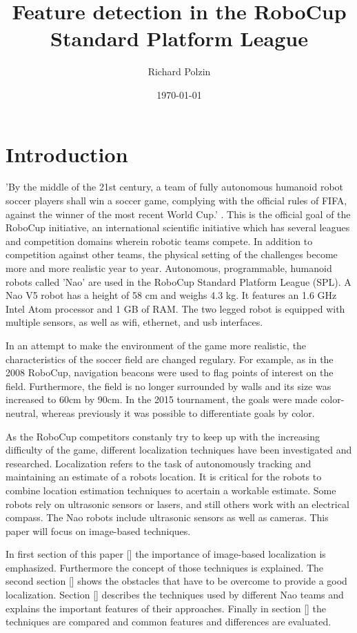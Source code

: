 \documentclass[12pt, a4paper, doc]{apa6}
\author{Richard Polzin}
\affiliation{PUT TUTOR NAME HERE}
\title{Feature detection in the RoboCup Standard Platform League}
\date{\today}
\begin{document}
  \maketitle

  \section{Introduction}
  'By the middle of the 21st century, a team of fully autonomous humanoid robot soccer players shall win a soccer game, complying with the official rules of FIFA, against the winner of the most recent World Cup.' \cite{Kitano95robocup:the}. This is the official goal of the RoboCup initiative, an international scientific initiative which has several leagues and competition domains wherein robotic teams compete. In addition to competition against other teams, the physical setting of the challenges become more and more realistic year to year. Autonomous, programmable, humanoid robots called 'Nao' are used in the RoboCup Standard Platform League (SPL). A Nao V5 robot has a height of 58 cm and weighs 4.3 kg. It features an 1.6 GHz Intel Atom processor and 1 GB of RAM. The two legged robot is equipped with multiple sensors, as well as wifi, ethernet, and usb interfaces.

  In an attempt to make the environment of the game more realistic, the characteristics of the soccer field are changed regulary. For example, as in the 2008 RoboCup, navigation beacons were used to flag points of interest on the field. Furthermore, the field is no longer surrounded by walls and its size was increased to 60cm by 90cm. In the 2015 tournament, the goals were made color-neutral, whereas previously it was possible to differentiate goals by color.

  As the RoboCup competitors constanly try to keep up with the increasing difficulty of the game, different localization techniques have been investigated and researched. Localization refers to the task of autonomously tracking and maintaining an estimate of a robots location. It is critical for the robots to combine location estimation techniques to acertain a workable estimate. Some robots rely on ultrasonic sensors or lasers, and still others work with an electrical compass. The Nao robots include ultrasonic sensors as well as cameras. This paper will focus on image-based techniques.

  In first section of this paper [] the importance of image-based localization is emphasized. Furthermore the concept of those techniques is explained. The second section [] shows the obstacles that have to be overcome to provide a good localization. Section [] describes the techniques used by different Nao teams and explains the important features of their approaches. Finally in section [] the techniques are compared and common features and differences are evaluated.
\end{document}
